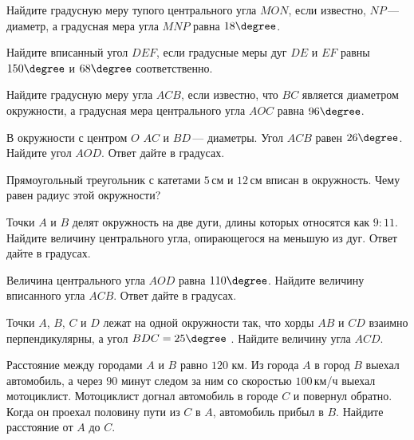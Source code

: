 \begin{class}[number=5]
\begin{listofex}
		\item Найдите градусную меру тупого центрального угла \( MON \), если известно, \( NP \) --- диаметр, а градусная мера угла \( MNP \) равна \( 18\degree \).
		\item Найдите вписанный угол \( DEF \), если градусные меры дуг \( DE \) и \( EF \) равны \( 150\degree \) и \( 68\degree \) соответственно.
		\item Найдите градусную меру угла \( ACB \), если известно, что \( BC \) является диаметром окружности, а градусная мера центрального угла \( AOC \) равна \( 96\degree \).
		\item В окружности с центром \( O \) \( AC \) и \( BD \) --- диаметры. Угол \( ACB \) равен \( 26\degree \). Найдите угол \( AOD \). Ответ дайте в градусах.
		\item Прямоугольный треугольник с катетами \( 5 \) см и \( 12 \) см вписан в окружность. Чему равен радиус этой окружности?
		\item Точки \( A \) и \( B \) делят окружность на две дуги, длины которых относятся как \( 9:11 \). Найдите величину центрального угла, опирающегося на меньшую из дуг. Ответ дайте в градусах.
		\item Величина центрального угла \( AOD \) равна \( 110\degree \). Найдите величину вписанного угла \( ACB \). Ответ дайте в градусах.
		\item Точки \( A \), \( B \), \( C \) и \( D \) лежат на одной окружности так, что хорды \( AB \) и \( CD \) взаимно перпендикулярны, а угол \( BDC=25\degree \) . Найдите величину угла \( ACD \).
		\item Расстояние между городами \( A \) и \( B \) равно \( 120  \) км. Из города \( A \) в город \( B \) выехал автомобиль, а через \( 90 \) минут следом за ним со скоростью \( 100 \) км/ч выехал мотоциклист. Мотоциклист догнал автомобиль в городе \( C \) и повернул обратно. Когда он проехал половину пути из \( C \) в \( A \), автомобиль прибыл в \( B \). Найдите расстояние от \( A \) до \( C \).
	\end{listofex}
\end{class}

